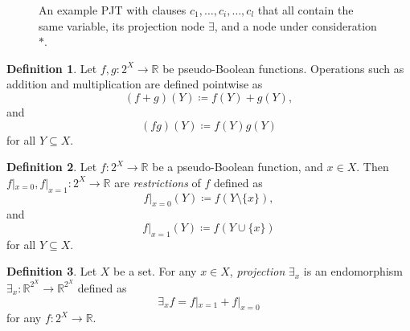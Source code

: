\documentclass{article}
\theoremstyle{definition}
\newtheorem{definition}{Definition}
\theoremstyle{remark}
\begin{document}
\begin{figure}
  \centering
  \caption{An example PJT with clauses $c_1, \dots, c_i, \dots, c_l$ that all
    contain the same variable, its projection node $\exists$, and a node under
    consideration $\ast$.}
  \label{fig:example_pjt}
\end{figure}

\begin{definition}
  Let $f, g\colon 2^X \to \mathbb{R}$ be pseudo-Boolean functions. Operations
  such as addition and multiplication are defined pointwise as
  \[
    (f+g)(Y) \coloneqq f(Y)+g(Y),
  \]
  and
  \[
    (fg)(Y) \coloneqq f(Y)g(Y)
  \]
  for all $Y \subseteq X$.
\end{definition}

\begin{definition}
  Let $f\colon 2^X \to \mathbb{R}$ be a pseudo-Boolean function, and $x \in X$.
  Then $f|_{x=0}, f|_{x=1}\colon 2^X \to \mathbb{R}$ are \emph{restrictions} of
  $f$ defined as
  \[
    f|_{x=0}(Y) \coloneqq f(Y \setminus \{x\}),
  \]
  and
  \[
    f|_{x=1}(Y) \coloneqq f(Y \cup \{x\})
  \]
  for all $Y \subseteq X$.
\end{definition}

\begin{definition} \label{def:projection}
  Let $X$ be a set. For any $x \in X$, \emph{projection} $\exists_x$ is an
  endomorphism $\exists_x\colon \mathbb{R}^{2^X} \to \mathbb{R}^{2^X}$ defined
  as
  \[
    \exists_xf = f|_{x=1} + f|_{x=0}
  \]
  for any $f\colon 2^X \to \mathbb{R}$.
\end{definition}
\end{document}
